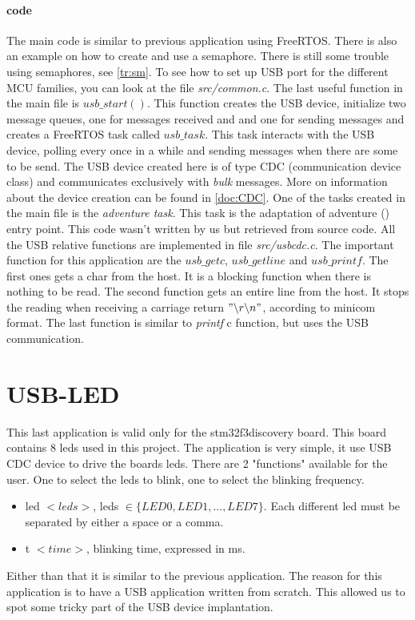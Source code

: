 \documentclass[12pt,a4paper]{report}
\begin{document}
\paragraph{code} The main code is similar to previous application using FreeRTOS. There is also an example on how to create and use a semaphore. There is still some trouble using semaphores, see \ref{tr:sm}. To see how to set up USB port for the different MCU families, you can look at the file \emph{src/common.c}. The last useful function in the main file is \emph{$usb\_start()$}. This function creates the USB device, initialize two message queues, one for messages received and and one for sending messages and creates a FreeRTOS task called $usb\_task$. This task interacts with the USB device, polling every once in a while and sending messages when there are some to be send. The USB device created here is of type CDC (communication device class) and communicates exclusively with \emph{bulk} messages. More on information about the device creation can be found in \ref{doc:CDC}.\newline
One of the tasks created in the main file is the \emph{adventure task}. This task is the adaptation of adventure (\cite{adventure}) entry point. This code wasn't written by us but retrieved from \cite{Gay2018} source code.\newline
All the USB relative functions are implemented in file \emph{src/usbcdc.c}. The important function for this application are the \emph{$usb\_getc$}, \emph{$usb\_getline$} and \emph{$usb\_printf$}. The first ones gets a char from the host. It is a blocking function when there is nothing to be read. The second function gets an entire line from the host. It stops the reading when receiving a carriage return $"\backslash r \backslash n"$, according to minicom format. The last function is similar to \emph{printf} c function, but uses the USB communication.
\section{USB-LED}
\label{sec:ul}
This last application is valid only for the stm32f3discovery board. This board contains 8 leds used in this project. The application is very simple, it use USB CDC device to drive the boards leds. There are 2 "functions" available for the user. One to select the leds to blink, one to select the blinking frequency.
\begin{itemize}
    \item led $<leds>$, leds $\in \{LED0, LED1, ..., LED7\} $. Each different led must be separated by either a space or a comma. 
    \item t $<time>$, blinking time, expressed in ms.
\end{itemize}
Either than that it is similar to the previous application. The reason for this application is to have a USB application written from scratch. This allowed us to spot some tricky part of the USB device implantation.
\end{document}
